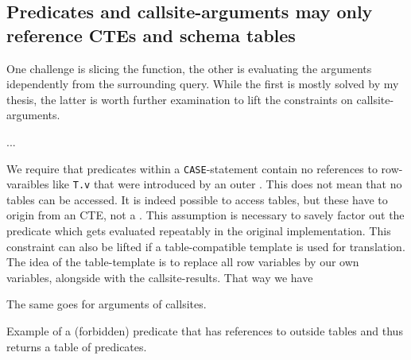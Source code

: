 \subsection{Predicates and callsite-arguments may only reference CTEs and schema tables}
One challenge is slicing the function, the other is evaluating the arguments idependently from the surrounding query. While the first is mostly solved by my thesis, the latter is worth further examination to lift the constraints on callsite-arguments.

...

We require that predicates within a \texttt{CASE}-statement contain no references to row-varaibles like \texttt{T.v} that were introduced by an outer \FROM. This does not mean that no tables can be accessed. It is indeed possible to access tables, but these have to origin from an CTE, not a \FROM. This assumption is necessary to savely factor out the predicate which gets evaluated repeatably in the original implementation. This constraint can also be lifted if a table-compatible template is used for translation. The idea of the table-template is to replace all row variables by our own variables, alongside with the callsite-results. That way we have 

The same goes for arguments of callsites.

\begin{listing}[ht]
\caption{Example of a (forbidden) predicate that has references to outside tables and thus returns a table of predicates.}
\label{lst:from_nonselfcontained}
\end{listing}